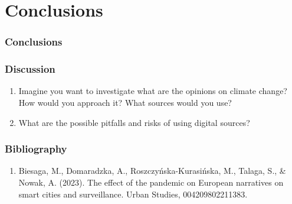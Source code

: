 \documentclass[aspectratio=169]{beamer}
\begin{document}
\section{Conclusions}
\begin{frame}
   \frametitle{Conclusions}
\end{frame}

\begin{frame}
   \frametitle{Discussion}
   \begin{enumerate}
      \item Imagine you want to investigate what are the opinions on climate change? How would you approach it? What sources would you use?
      \item What are the possible pitfalls and risks of using digital sources?
   \end{enumerate}
\end{frame}

\begin{frame}
    \frametitle{Bibliography}
    \begin{enumerate}
      \item Biesaga, M., Domaradzka, A., Roszczyńska-Kurasińska, M., Talaga, S., \& Nowak, A. (2023). The effect of the pandemic on European narratives on smart cities and surveillance. Urban Studies, 004209802211383. \href{https://doi.org/10.1177/00420980221138317}{\color{blue}{https://doi.org/10.1177/00420980221138317}}
    \end{enumerate}
\end{frame}
\end{document}
